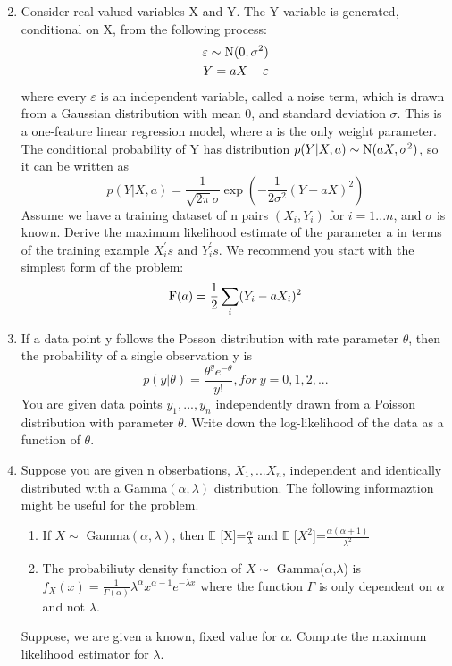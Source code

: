 \documentclass[a4paper]{article}
\begin{document}
\begin{enumerate}
\begin{equation*}
		\end{equation*}
		\item
		Consider real-valued variables X and Y. The Y variable is generated, conditional on X, from the following process:
		\begin{equation*}
		\begin{split}
			\varepsilon \sim {\rm N}(0,\sigma^2) \\
			Y = aX+\varepsilon
		\end{split}
		\end{equation*}
		where every $\varepsilon$ is an independent variable, called a noise term, which is drawn from a Gaussian distribution with mean 0, and standard deviation $\sigma$. This is a one-feature linear regression model, where a is the only weight parameter. The conditional probability of Y has distribution $p(Y|X,a)\sim{\rm N}(aX,\sigma^2)$, so it can be written as 
		\begin{equation*}
			p(Y|X,a)=\frac{1}{\sqrt{2\pi}\sigma}\exp(-\frac{1}{2\sigma^2}(Y-aX)^2)
		\end{equation*} 
		Assume we have a training dataset of n pairs $(X_i,Y_i)$ for $i=1...n$, and $\sigma$ is known. Derive the maximum likelihood estimate of the parameter a in terms of the training example $X_i^{'}s$ and $Y_i^{'}s$. We recommend you start with the simplest form of the problem:
		\begin{equation*}
			{\rm F}(a)=\frac{1}{2}\sum_{i}(Y_i - aX_i)^2
		\end{equation*} 
		\item
		If a data point y follows the Posson distribution with rate parameter $\theta$, then the probability of a single observation y is 
		\begin{equation*}
			p(y|\theta)=\frac{\theta^ye^{-\theta}}{y!}, for \  y = 0,1,2,...
		\end{equation*}
		You are given data points $y_1,...,y_n$ independently drawn from a Poisson distribution with parameter $\theta$. Write down the log-likelihood of the data as a function of $\theta$.
		\item
		Suppose you are given n obserbations, $X_1,...X_n$, independent and identically distributed with a Gamma$(\alpha,\lambda)$ distribution. The following informaztion might be useful for the problem.
		\begin{enumerate}
			\item
			If $X \sim $ Gamma$(\alpha,\lambda)$, then $\mathbb{E}$ [X]=$\frac{\alpha}{\lambda}	$ and $\mathbb{E}$ [$X^2$]=$\frac{\alpha(\alpha + 1)}{\lambda^2}$
			\item
			The probabiliuty density function of $X \sim$ Gamma($\alpha$,$\lambda$) is $f_X(x)=\frac{1}{\Gamma(\alpha)}\lambda^\alpha x^{\alpha - 1}e^{-\lambda x}$ where the function $\Gamma$ is only dependent on $\alpha$ and not $\lambda$.
		\end{enumerate}
		Suppose, we are given a known, fixed value for $\alpha$. Compute the maximum likelihood estimator for $\lambda$.
		
	\end{enumerate}
\end{document}
